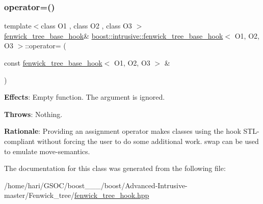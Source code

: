 \subsubsection{\texorpdfstring{operator=()}{operator=()}}
{\footnotesize\ttfamily template$<$class O1 , class O2 , class O3 $>$ \\
\hyperlink{classboost_1_1intrusive_1_1fenwick__tree__base__hook}{fenwick\+\_\+tree\+\_\+base\+\_\+hook}\& \hyperlink{classboost_1_1intrusive_1_1fenwick__tree__base__hook}{boost\+::intrusive\+::fenwick\+\_\+tree\+\_\+base\+\_\+hook}$<$ O1, O2, O3 $>$\+::operator= (\begin{DoxyParamCaption}\item[{const \hyperlink{classboost_1_1intrusive_1_1fenwick__tree__base__hook}{fenwick\+\_\+tree\+\_\+base\+\_\+hook}$<$ O1, O2, O3 $>$ \&}]{ }\end{DoxyParamCaption})}

{\bfseries Effects}\+: Empty function. The argument is ignored.

{\bfseries Throws}\+: Nothing.

{\bfseries Rationale}\+: Providing an assignment operator makes classes using the hook S\+T\+L-\/compliant without forcing the user to do some additional work. {\ttfamily swap} can be used to emulate move-\/semantics. 

The documentation for this class was generated from the following file\+:\begin{DoxyCompactItemize}
\item 
/home/hari/\+G\+S\+O\+C/boost\+\_\+\_\+\_/boost/\+Advanced-\/\+Intrusive-\/master/\+Fenwick\+\_\+tree/\hyperlink{fenwick__tree__hook_8hpp}{fenwick\+\_\+tree\+\_\+hook.\+hpp}\end{DoxyCompactItemize}
